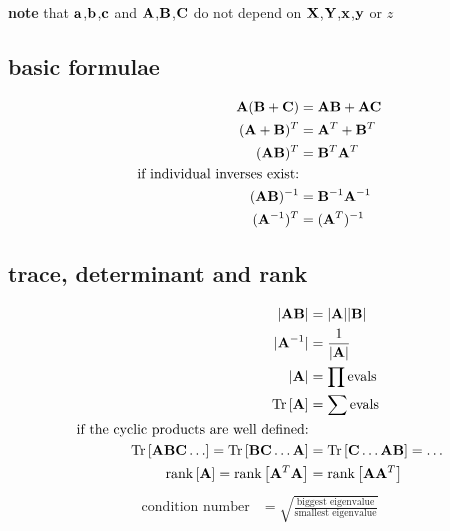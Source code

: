 \documentclass[12pt]{article}
\begin{document}



\noindent \textbf{note}
that $\aaa$,$\bb$,$\cc$ and $\AA$,$\BB$,$\CC$ 
do not depend on $\XX$,$\YY$,$\xx$,$\yy$ or $z$

\subsection{basic formulae}
\begin{align}
\AA(\BB + \CC) & = \AA\BB + \AA \CC \\
(\AA + \BB)^T & = \AA^T + \BB^T \\
(\AA\BB)^T & = \BB^T \AA^T \\
\text{if individual inverses exist:} \nonumber\\
(\AA\BB)^{-1} & = \BB^{-1}\AA^{-1} \\
(\AA^{-1})^T & = (\AA^T)^{-1}
\end{align}

\subsection{trace, determinant and rank}
\begin{align}
|\AA \BB| & = |\AA| |\BB| \\
|\AA^{-1}| & = \frac{1}{|\AA|} \\
|\AA| & = \prod \text{evals} \\
\trace{\AA} & = \sum \text{evals} \\
\text{if the cyclic products are well defined:} \nonumber\\
\trace{\AA\BB\CC \dots}   = \trace{\BB\CC \dots \AA}
                        & = \trace{\CC \dots \AA\BB}
                          = \dots \\
\rank{\AA}   = \rank{\AA^T\AA}
           & = \rank{\AA\AA^T}
\end{align}
\begin{align}
\text{condition number} & = \sqrt{\frac{\text{biggest
eigenvalue}}{\text{smallest eigenvalue}}}
\end{align}
\end{document}
